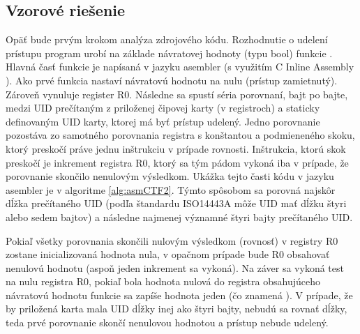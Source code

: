\subsection{Vzorové riešenie}
Opäť bude prvým krokom analýza zdrojového kódu. Rozhodnutie o udelení prístupu program urobí na základe návratovej hodnoty (typu bool) funkcie . Hlavná časť funkcie  je napísaná v jazyku asembler (s využitím C Inline Assembly \cite{inlineAsm}). Ako prvé funkcia nastaví návratovú hodnotu na nulu (prístup zamietnutý). Zároveň vynuluje register R0. Následne sa spustí séria porovnaní, bajt po bajte, medzi UID prečítaným z priloženej čipovej karty (v registroch) a staticky definovaným UID karty, ktorej má byť prístup udelený. Jedno porovnanie pozostáva zo samotného porovnania registra s konštantou a podmieneného skoku, ktorý preskočí práve jednu inštrukciu v prípade rovnosti. Inštrukcia, ktorú skok preskočí je inkrement registra R0, ktorý sa tým pádom vykoná iba v prípade, že porovnanie skončilo nenulovým výsledkom. Ukážka tejto časti kódu v jazyku asembler je v algoritme \ref{alg:asmCTF2}. Týmto spôsobom sa porovná najskôr dĺžka prečítaného UID (podľa štandardu ISO14443A môže UID mať dĺžku štyri alebo sedem bajtov) a následne najmenej významné štyri bajty prečítaného UID. 

Pokiaľ všetky porovnania skončili nulovým výsledkom (rovnosť) v registry R0 zostane inicializovaná hodnota nula, v opačnom prípade bude R0 obsahovať nenulovú hodnotu (aspoň jeden inkrement sa vykoná). Na záver sa vykoná test na nulu registra R0, pokiaľ bola hodnota nulová do registra obsahujúceho návratovú hodnotu funkcie sa zapíše hodnota jeden (čo znamená ). V prípade, že by priložená karta mala UID dĺžky inej ako štyri bajty, nebudú sa rovnať dĺžky, teda prvé porovnanie skončí nenulovou hodnotou a prístup nebude udelený.


